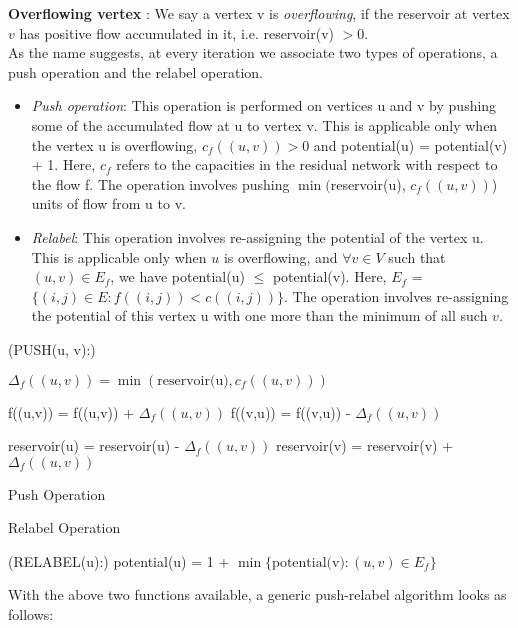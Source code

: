 \documentclass[BTech]{iitmdiss}
\begin{document}
	    \textbf{Overflowing vertex} : We say a vertex v is \textit{overflowing}, if the reservoir at vertex $v$ has positive flow accumulated in it,
	    i.e. reservoir(v) $>0$. \\
	    
	    As the name suggests, at every iteration we associate two types of operations, a push operation and the relabel operation.
	    \begin{itemize}
	     \item 
	      \textit{Push operation}: This operation is performed on vertices u and v by pushing some of the accumulated flow at u to vertex v.
	      This is applicable only when the vertex u is overflowing, $c_f((u,v))>0$ and potential(u) = potential(v) + 1. Here, $c_f$ refers to the 
	      capacities in the residual network with respect to the flow f. The operation involves pushing $\min($reservoir(u), $c_f((u,v))$) units of flow
	      from u to v.
	     \item
	      \textit{Relabel}: This operation involves re-assigning the potential of the vertex u. This is applicable only when $u$ is overflowing, and
	      $\forall v \in V$ such that $(u,v) \in E_f$, we have potential(u) $\leq$ potential(v). Here, $E_f$ = $\{(i,j) \in E : f((i,j)) < c((i,j))\}$.
	      The operation involves re-assigning the potential of this vertex u with one more than the minimum of all such $v$.
	    \end{itemize}
	    
	    \begin{algorithm}[H]
	      \Begin(PUSH{(u, v)}:)
	      {
		$\Delta_f((u,v)) = \min(\text{reservoir(u)}, c_f((u,v)))$ \;
		
		{
		    f((u,v)) = f((u,v)) + $\Delta_f((u,v))$ \;
		}
		{
		  f((v,u)) = f((v,u)) - $\Delta_f((u,v))$ \;
		}
				
		reservoir(u) = reservoir(u) - $\Delta_f((u,v))$ \;
		reservoir(v) = reservoir(v) + $\Delta_f((u,v))$ \;
	      }
      
	      \caption{Push Operation}
	    \end{algorithm}
	    
	    \begin{algorithm}[H]
	      \caption{Relabel Operation}
	      
	      \Begin(RELABEL{(u)}:){
		potential(u) =  1 + $\min \{\text{potential(v)} : (u,v) \in E_f \}$ \;
	      }
	    \end{algorithm}
	    
	    With the above two functions available, a generic push-relabel algorithm looks as follows:
	    
\end{document}
